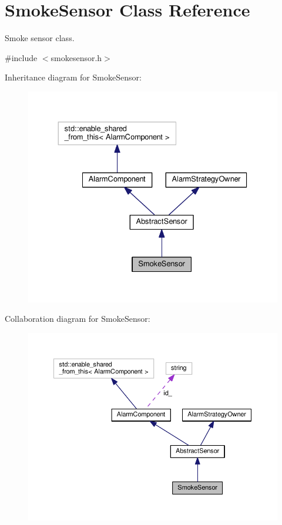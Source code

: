 \hypertarget{classSmokeSensor}{}\section{Smoke\+Sensor Class Reference}
\label{classSmokeSensor}


Smoke sensor class.  




{\ttfamily \#include $<$smokesensor.\+h$>$}



Inheritance diagram for Smoke\+Sensor\+:
\nopagebreak
\begin{figure}[H]
\begin{center}
\leavevmode
\includegraphics[width=330pt]{classSmokeSensor__inherit__graph}
\end{center}
\end{figure}


Collaboration diagram for Smoke\+Sensor\+:
\nopagebreak
\begin{figure}[H]
\begin{center}
\leavevmode
\includegraphics[width=350pt]{classSmokeSensor__coll__graph}
\end{center}
\end{figure}
